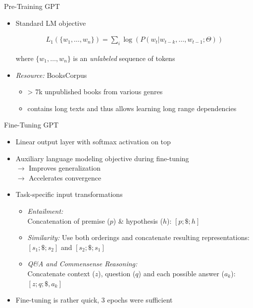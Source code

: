 \documentclass[11pt,compress,t,notes=noshow, xcolor=table]{beamer}
\begin{document}

\begin{frame}{Pre-Training GPT}

\vfill

\begin{itemize}
		\item Standard LM objective

\begin{align*}
	L_1(\{w_1, \hdots, w_n\}) = \sum_i \log(P(w_t | w_{t-k}, \hdots, w_{t-1}; \Theta))
\end{align*}
					
					where $\{w_1, \hdots, w_n\}$ is an \textit{unlabeled} sequence of tokens

		\item \textit{Resource:} BooksCorpus 
			\begin{itemize}
				\item > 7k unpublished books from various genres
				\item contains long texts and thus allows learning long range dependencies
			\end{itemize}
\end{itemize}

\vfill

\end{frame}


\begin{frame}{Fine-Tuning GPT}

\vfill
			
\begin{itemize}
		\item Linear output layer with softmax activation on top
		\item Auxiliary language modeling objective during fine-tuning\\
					$\rightarrow$ Improves generalization\\
					$\rightarrow$ Accelerates convergence
		\item Task-specific input transformations
					\begin{itemize}
						\item \textit{Entailment:} \\ Concatenation of premise ($p$) \& hypothesis ($h$): $[p; \$; h]$
						\item \textit{Similarity:} Use both orderings and concatenate resulting representations: $[s_1; \$; s_2]$ and $[s_2; \$; s_1]$
						\item \textit{Q\&A and Commensense Reasoning:} \\ Concatenate context ($z$), question ($q$) and each possible answer ($a_k$): $[z; q; \$, a_k]$
					\end{itemize}
		\item Fine-tuning is rather quick, 3 epochs were sufficient
\end{itemize}

\vfill

\end{frame}
\end{document}
